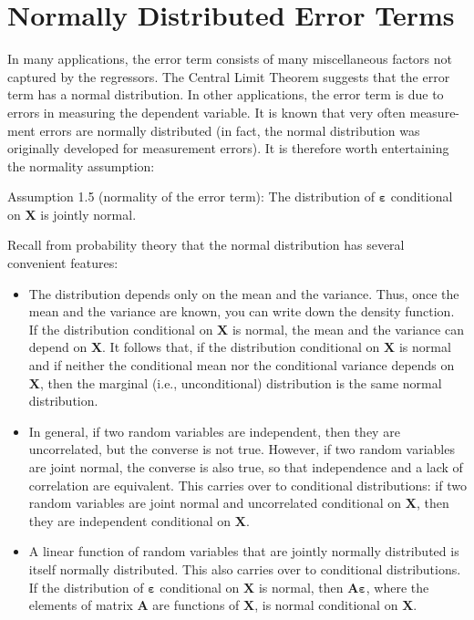\documentclass[10pt]{article}
\begin{document}
\section*{Normally Distributed Error Terms}
In many applications, the error term consists of many miscellaneous factors not captured by the regressors. The Central Limit Theorem suggests that the error term has a normal distribution. In other applications, the error term is due to errors in measuring the dependent variable. It is known that very often measure-\\
ment errors are normally distributed (in fact, the normal distribution was originally developed for measurement errors). It is therefore worth entertaining the normality assumption:

Assumption 1.5 (normality of the error term): The distribution of $\boldsymbol{\varepsilon}$ conditional on $\mathbf{X}$ is jointly normal.

Recall from probability theory that the normal distribution has several convenient features:

\begin{itemize}
  \item The distribution depends only on the mean and the variance. Thus, once the mean and the variance are known, you can write down the density function. If the distribution conditional on $\mathbf{X}$ is normal, the mean and the variance can depend on $\mathbf{X}$. It follows that, if the distribution conditional on $\mathbf{X}$ is normal and if neither the conditional mean nor the conditional variance depends on $\mathbf{X}$, then the marginal (i.e., unconditional) distribution is the same normal distribution.
  \item In general, if two random variables are independent, then they are uncorrelated, but the converse is not true. However, if two random variables are joint normal, the converse is also true, so that independence and a lack of correlation are equivalent. This carries over to conditional distributions: if two random variables are joint normal and uncorrelated conditional on $\mathbf{X}$, then they are independent conditional on $\mathbf{X}$.
  \item A linear function of random variables that are jointly normally distributed is itself normally distributed. This also carries over to conditional distributions. If the distribution of $\boldsymbol{\varepsilon}$ conditional on $\mathbf{X}$ is normal, then $\mathbf{A} \boldsymbol{\varepsilon}$, where the elements of matrix $\mathbf{A}$ are functions of $\mathbf{X}$, is normal conditional on $\mathbf{X}$.
\end{itemize}
\end{document}
